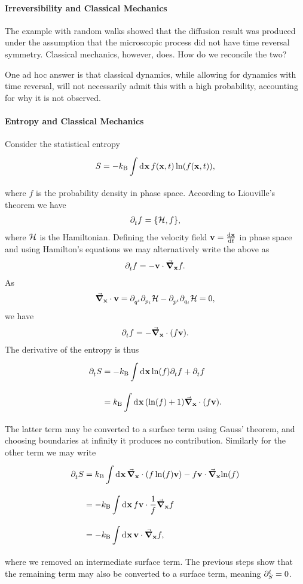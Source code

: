 \paragraph{Irreversibility and Classical Mechanics}
The example with random walks showed that the diffusion result was produced under the assumption that the microscopic process did not have time reversal symmetry. Classical mechanics, however, does. How do we reconcile the two?

One ad hoc answer is that classical dynamics, while allowing for dynamics with time reversal, will not necessarily admit this with a high probability, accounting for why it is not observed.

\paragraph{Entropy and Classical Mechanics}
Consider the statistical entropy
\begin{align*}
	S = -k_{\text{B}}\int\limits_{}^{}\dd[]{\vb{x}}f(\vb{x}, t)\ln(f(\vb{x}, t)),
\end{align*}
where $f$ is the probability density in phase space. According to Liouville's theorem we have
\begin{align*}
	\del{}{t}f = \pb{\ham}{f},
\end{align*}
where $\mathcal{H}$ is the Hamiltonian. Defining the velocity field $\vb{v} = \dv{\vb{x}}{t}$ in phase space and using Hamilton's equations we may alternatively write the above as
\begin{align*}
	\partial^{}_{t}f = -\vb{v}\cdot\grad_{\vb{x}}{f}.
\end{align*}
As
\begin{align*}
	\grad_{\vb{x}}\cdot\vb{v} = \partial^{}_{q^{i}}{\partial^{}_{p_{i}}{\mathcal{H}}} - \partial^{}_{p^{i}}{\partial^{}_{q_{i}}{\mathcal{H}}} = 0,
\end{align*}
we have
\begin{align*}
	\partial^{}_{t}f = -\grad_{\vb{x}}\cdot(f\vb{v}).
\end{align*}
The derivative of the entropy is thus
\begin{align*}
	\partial^{}_{t}S &= -k_{\text{B}}\int\limits_{}^{}\dd[]{\vb{x}}\ln(f)\partial^{}_{t}f + \partial^{}_{t}f \\
	           &= k_{\text{B}}\int\limits_{}^{}\dd[]{\vb{x}}(\ln(f) + 1)\grad_{\vb{x}}\cdot(f\vb{v}).
\end{align*}
The latter term may be converted to a surface term using Gauss' theorem, and choosing boundaries at infinity it produces no contribution. Similarly for the other term we may write
\begin{align*}
	\partial^{}_{t}S &= k_{\text{B}}\int\limits_{}^{}\dd[]{\vb{x}}\grad_{\vb{x}}\cdot(f\ln(f)\vb{v}) - f\vb{v}\cdot\grad_{\vb{x}}{\ln(f)} \\
	           &= -k_{\text{B}}\int\limits_{}^{}\dd[]{\vb{x}}f\vb{v}\cdot\frac{1}{f}\grad_{\vb{x}}{f} \\
	           &= -k_{\text{B}}\int\limits_{}^{}\dd[]{\vb{x}}\vb{v}\cdot\grad_{\vb{x}}{f},
\end{align*}
where we removed an intermediate surface term. The previous steps show that the remaining term may also be converted to a surface term, meaning $\partial^{t}_{S} = 0$.

